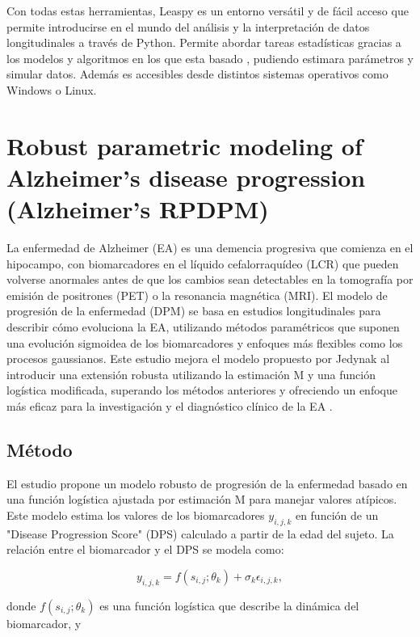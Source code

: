 	Con todas estas herramientas, Leaspy es un entorno versátil y de fácil acceso que permite introducirse en el mundo del análisis y la interpretación de datos longitudinales a través de Python. Permite abordar tareas estadísticas gracias a los modelos y algoritmos en los que esta basado , pudiendo estimara parámetros y simular datos. Además es accesibles desde distintos sistemas operativos como Windows o Linux.
	
\section{Robust parametric modeling of Alzheimer's disease progression (Alzheimer's RPDPM)}

La enfermedad de Alzheimer (EA) es una demencia progresiva que comienza en el hipocampo, con biomarcadores en el líquido cefalorraquídeo (LCR) que pueden volverse anormales antes de que los cambios sean detectables en la tomografía por emisión de positrones (PET) o la resonancia magnética (MRI). El modelo de progresión de la enfermedad (DPM) se basa en estudios longitudinales para describir cómo evoluciona la EA, utilizando métodos paramétricos que suponen una evolución sigmoidea de los biomarcadores y enfoques más flexibles como los procesos gaussianos. Este estudio mejora el modelo propuesto por Jedynak al introducir una extensión robusta utilizando la estimación M y una función logística modificada, superando los métodos anteriores y ofreciendo un enfoque más eficaz para la investigación y el diagnóstico clínico de la EA \cite{ghazi2021robust}.\\

\subsection{Método}

El estudio propone un modelo robusto de progresión de la enfermedad basado en una función logística ajustada por estimación M para manejar valores atípicos. Este modelo estima los valores de los biomarcadores \( y_{i,j,k} \) en función de un "Disease Progression Score" (DPS) calculado a partir de la edad del sujeto. La relación entre el biomarcador y el DPS se modela como:

\begin{equation}
	y_{i,j,k} = f(s_{i,j}; \theta_k) + \sigma_k \epsilon_{i,j,k},
\end{equation}


donde \( f(s_{i,j}; \theta_k) \) es una función logística que describe la dinámica del biomarcador, y

